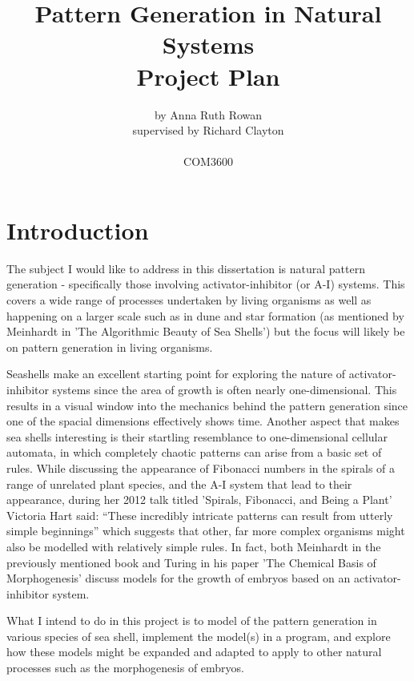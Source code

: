 \documentclass[a4paper,11pt]{report}
\title{
  {Pattern Generation in Natural Systems}\\
  {\large Project Plan}
}
\author{
  {by Anna Ruth Rowan}\\
  {supervised by Richard Clayton}\\
  \\
  {COM3600}
}
\begin{document}
\maketitle

\section*{Introduction}
The subject I would like to address in this dissertation is natural pattern generation - specifically those involving activator-inhibitor (or A-I) systems. This covers a wide range of processes undertaken by living organisms as well as happening on a larger scale such as in dune and star formation (as mentioned by Meinhardt in 'The Algorithmic Beauty of Sea Shells') but the focus will likely be on pattern generation in living organisms. 

Seashells make an excellent starting point for exploring the nature of activator-inhibitor systems since the area of growth is often nearly one-dimensional. This results in a visual window into the mechanics behind the pattern generation since one of the spacial dimensions effectively shows time. Another aspect that makes sea shells interesting is their startling resemblance to one-dimensional cellular automata, in which completely chaotic patterns can arise from a basic set of rules. 
While discussing the appearance of Fibonacci numbers in the spirals of a range of unrelated plant species, and the A-I system that lead to their appearance, during her 2012 talk titled 'Spirals, Fibonacci, and Being a Plant' Victoria Hart said:
``These incredibly intricate patterns can result from utterly simple beginnings''
which suggests that other, far more complex organisms might also be modelled with relatively simple rules. In fact, both Meinhardt in the previously mentioned book and Turing in his paper 'The Chemical Basis of Morphogenesis' discuss models for the growth of embryos based on an activator-inhibitor system.

What I intend to do in this project is to model of the pattern generation in various species of sea shell, implement the model(s) in a program, and explore how these models might be expanded and adapted to apply to other natural processes such as the morphogenesis of embryos.
\end{document}
